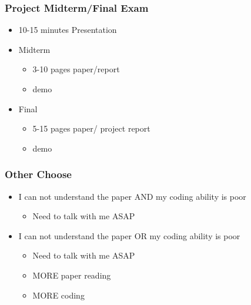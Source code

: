 \begin{frame}[plain]	
	\frametitle{Project Midterm/Final Exam}
	
	\begin{itemize}\Large
		\item 10-15 minutes Presentation
		\item Midterm
		\begin{itemize}\large
			\item 3-10 pages paper/report
			\item demo
			
		\end{itemize}
		\item Final
		\begin{itemize}\large
			\item 5-15 pages paper/ project report
			\item demo
			
		\end{itemize}	
	\end{itemize}
	
	
\end{frame}

\begin{frame}[plain]	
	\frametitle{Other Choose}
	
	\begin{itemize}\Large
		\item I can not understand the paper AND my coding
		ability is poor
		\begin{itemize}\large
			\item Need to talk with me ASAP
			
		\end{itemize}
		\item I can not understand the paper OR my coding
	ability is poor
		\begin{itemize}\large
			\item Need to talk with me ASAP
			\item MORE paper reading
			\item MORE coding		
		\end{itemize}
	\end{itemize}
	
	
\end{frame}
